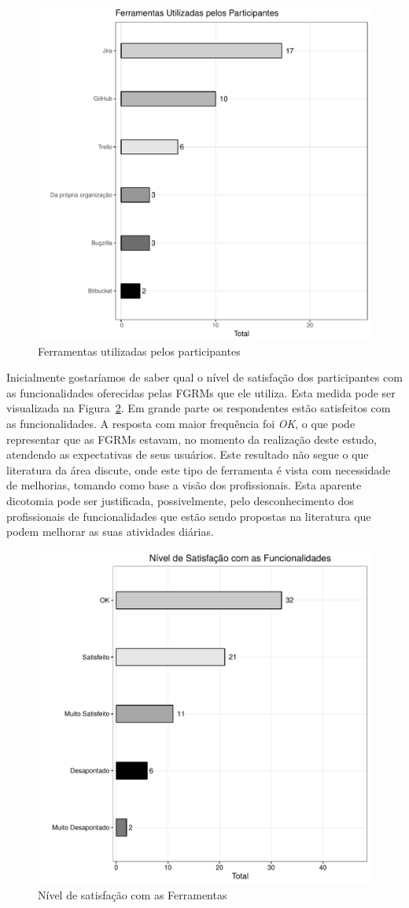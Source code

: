 \begin{figure}[htpb]
	\centering
	\includegraphics[width=0.6\linewidth]{./chapter-pesquisa-com-profissionais/img/grafico_melhorias_fgrm_ferramentas_utilizadas.pdf}
	\caption{Ferramentas utilizadas pelos participantes}
\label{fig:grafico_melhorias_fgrm_ferramentas_utilizadas}
\end{figure}

Inicialmente gostaríamos de saber qual o nível de satisfação dos participantes
com as funcionalidades oferecidas pelas FGRMs que ele utiliza. Esta medida pode
ser visualizada na Figura~\ref{fig:grafico_melhorias_fgrm_nivel_satisfacao}. Em
grande parte os respondentes estão satisfeitos com as funcionalidades. A
resposta com maior frequência foi \textit{OK}, o que pode representar que as
FGRMs estavam, no momento da realização deste estudo, atendendo as expectativas
de seus usuários. Este resultado não segue o que literatura da área discute,
onde este tipo de ferramenta é vista com necessidade de melhorias, tomando como
base a visão dos profissionais. Esta aparente dicotomia pode ser justificada,
possivelmente, pelo desconhecimento dos profissionais de funcionalidades que
estão sendo propostas na literatura que podem melhorar as suas atividades
diárias.

\begin{figure}[htpb] \centering
    \includegraphics[width=0.6\linewidth]{./chapter-pesquisa-com-profissionais/img/grafico_melhorias_fgrm_nivel_satisfacao.pdf}
    \caption{Nível de satisfação com as Ferramentas}
\label{fig:grafico_melhorias_fgrm_nivel_satisfacao}
\end{figure}

